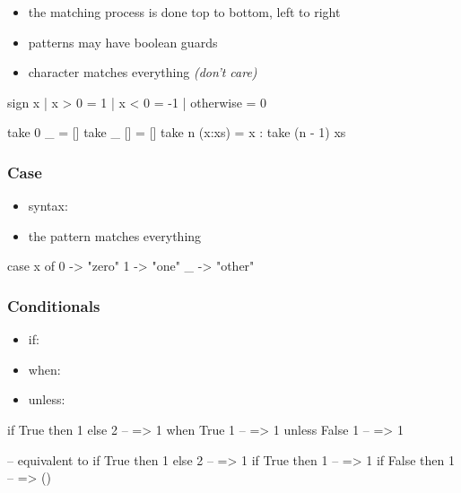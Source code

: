 \documentclass[a4paper,landscape,10pt]{article}
\begin{document}
\begin{multicols*}{2}
  \begin{itemize}
    \item the matching process is done top to bottom, left to right
    \item patterns may have boolean guards
    \item character \ihaskell{_} matches everything \textit{(don't care)}
  \end{itemize}

  \begin{haskell}
sign x | x > 0 = 1
       | x < 0 = -1
       | otherwise = 0

take 0 _ = []
take _ [] = []
take n (x:xs) = x : take (n - 1) xs
\end{haskell}

  \breakcolumn

  \subsubsection{Case}

  \begin{itemize}
    \item syntax: 
    \item the \ihaskell{_} pattern matches everything
  \end{itemize}

  \begin{haskell}
case x of
  0 -> "zero"
  1 -> "one"
  _ -> "other"
\end{haskell}

  \subsubsection{Conditionals}

  \begin{itemize}
    \item if: 
    \item when: 
    \item unless: 
  \end{itemize}

  \begin{haskell}
if True then 1 else 2 -- => 1
  when True 1 -- => 1
  unless False 1 -- => 1

-- equivalent to
if True then 1 else 2 -- => 1
if True then 1 -- => 1
if False then 1 -- => ()


\end{haskell}
\end{multicols*}
\end{document}
